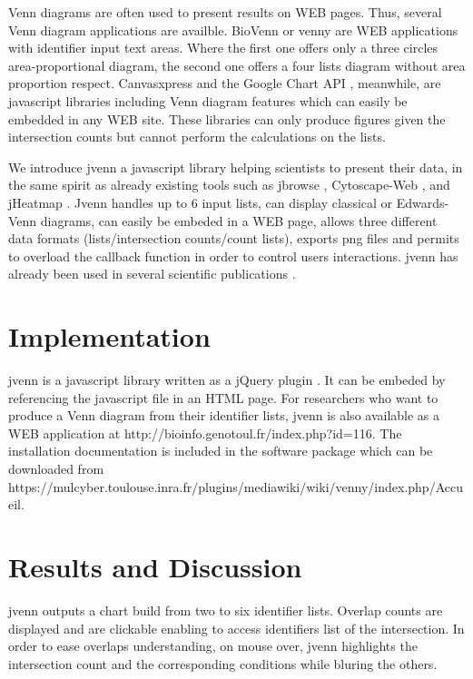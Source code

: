 \documentclass{bmcart}
\begin{document}
Venn diagrams are often used to present results on WEB pages. Thus, several Venn diagram applications are 
availble. BioVenn \cite{Hulsen2008} or venny \cite{venny} are WEB applications with identifier input text 
areas. Where the first one offers only a three circles area-proportional diagram, the second one offers a 
four lists diagram without area proportion respect. Canvasxpress \cite{canvasxpress} and the Google Chart 
API \cite{googleAPI}, meanwhile, are javascript libraries including Venn diagram features which can easily 
be embedded in any WEB site. These libraries can only produce figures given the intersection counts but 
cannot perform the calculations on the lists.

We introduce jvenn a javascript library helping scientists to present their data, in the same spirit as already 
existing tools such as jbrowse \cite{Westesson01032013}, Cytoscape-Web \cite{Lopes2010}, and jHeatmap \cite{DeuPons2014}. 
Jvenn handles up to 6 input lists, can display classical or Edwards-Venn \cite{Edwards2004} diagrams, can easily be 
embeded in a WEB page, allows three different data formats (lists/intersection counts/count lists), exports png files and permits 
to overload the callback function in order to control users interactions. jvenn has already been used in several scientific 
publications \cite{Bianchia2013, Aravindraja2013}.


\section*{Implementation}

jvenn is a javascript library written as a jQuery plugin \cite{jquery}. It can be embeded by referencing the javascript file 
in an HTML page. For researchers who want to produce a Venn diagram from their identifier lists, jvenn is also available as a 
WEB application at http://bioinfo.genotoul.fr/index.php?id=116. The installation documentation is included in the software package 
which can be downloaded from https://mulcyber.toulouse.inra.fr/plugins/mediawiki/wiki/venny/index.php/Accueil.


\section*{Results and Discussion}

jvenn outputs a chart build from two to six identifier lists. Overlap counts are displayed and are clickable enabling to access
identifiers list of the intersection. In order to ease overlaps understanding, on mouse over, jvenn highlights the intersection count
and the corresponding conditions while bluring the others.
\end{document}
